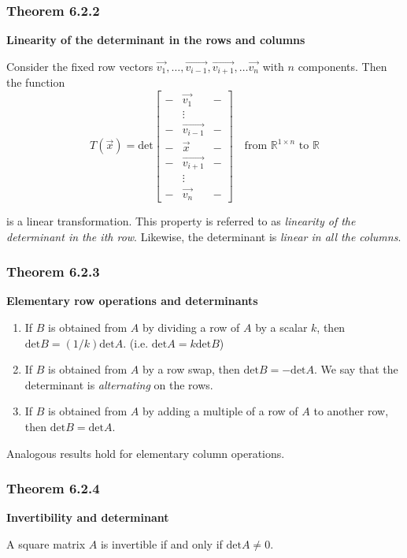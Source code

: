 \documentclass{report}
\begin{document}
\subsubsection*{Theorem 6.2.2}
\par\noindent\textbf{Linearity of the determinant in the rows and columns}
\par\noindent Consider the fixed row vectors $\vec{v_{1}},\ldots{},\vec{v_{i-1}},\vec{v_{i+1}},\ldots{}\vec{v_{n}}$ with $n$ components. Then the function
\[T(\vec{x})=\textrm{det}\left[\begin{array}{ccc}-&\vec{v_{1}}&-\\{} &\vdots{}&\\{} -&\vec{v_{i-1}}&-\\{} -&\vec{x}&-\\{} -&\vec{v_{i+1}}&-\\{} &\vdots{}&\\{} -&\vec{v_{n}}&- \end{array}\right]\quad{}\textrm{from }\mathbb{R}^{1\times{}n}\textrm{ to }\mathbb{R}\]
\par\noindent is a linear transformation. This property is referred to as \textit{linearity of the determinant in the i\textnormal{th} row}. Likewise, the determinant is \textit{linear in all the columns}.
\subsubsection*{Theorem 6.2.3}
\par\noindent\textbf{Elementary row operations and determinants}
\renewcommand{\labelenumi}{\textbf{\alph{enumi}.}}
\begin{enumerate}
\item If $B$ is obtained from $A$ by dividing a row of $A$ by a scalar $k$, then $\textrm{det}B=(1/k)\textrm{det}A$. (i.e. $\textrm{det}A=k\textrm{det}B$)
\item If $B$ is obtained from $A$ by a row swap, then $\textrm{det}B=-\textrm{det}A$. We say that the determinant is \textit{alternating} on the rows.
\item If $B$ is obtained from $A$ by adding a multiple of a row of $A$ to another row, then $\textrm{det}B=\textrm{det}A$.
\end{enumerate}
\par\noindent Analogous results hold for elementary column operations.
\subsubsection*{Theorem 6.2.4}
\par\noindent\textbf{Invertibility and determinant}
\par\noindent A square matrix $A$ is invertible if and only if $\textrm{det}A\ne{}0$.
\end{document}
